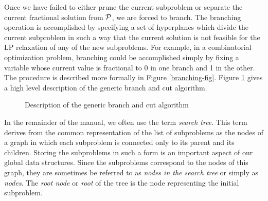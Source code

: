 \indent Once we have failed to either prune the current subproblem or separate
the current fractional solution from ${\cal P}$, we are forced to
branch. The branching operation is accomplished by specifying a set of
hyperplanes which divide the current subproblem in such a way that the
current solution is not feasible for the LP relaxation of any of the
new subproblems. For example, in a combinatorial optimization problem,
branching could be accomplished simply by fixing a variable whose
current value is fractional to 0 in one branch and 1
in the other. The procedure is described more formally in Figure
\ref{branching-fig}. Figure \ref{gb&c} gives a high level description
of the generic branch and cut algorithm.
\begin{figure}
\caption{Description of the generic branch and cut algorithm}
\label{gb&c}
\end{figure}

In the remainder of the manual, we often use the term {\em search
tree}. This term derives from the common representation of the list of
subproblems as the nodes of a graph in which each subproblem is
connected only to its parent and its children. Storing the subproblems
in such a form is an important aspect of our global data structures.
Since the subproblems correspond to the nodes of this graph, they are
sometimes be referred to as {\em nodes in the search tree} or simply
as {\em nodes}. The {\em root node} or {\em root} of the tree is the
node representing the initial subproblem.

